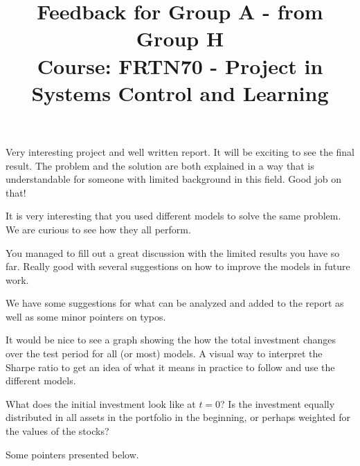 \documentclass[a4paper,11pt]{article}
\title{Feedback for Group A - from Group H \\ Course: FRTN70 - Project in Systems Control and Learning}
\date{}
\begin{document}
\maketitle

Very interesting project and well written report.
It will be exciting to see the final result.
The problem and the solution are both explained in a way that is understandable for someone with limited background in this field.
Good job on that!

It is very interesting that you used different models to solve the same problem.
We are curious to see how they all perform.

You managed to fill out a great discussion with the limited results you have so far.
Really good with several suggestions on how to improve the models in future work.

We have some suggestions for what can be analyzed and added to the report as well as some minor pointers on typos.

It would be nice to see a graph showing the how the total investment changes over the test period for all (or most) models.
A visual way to interpret the Sharpe ratio to get an idea of what it means in practice to follow and use the different models.

What does the initial investment look like at $t = 0$?
Is the investment equally distributed in all assets in the portfolio in the beginning, or perhaps weighted for the values of the stocks?

Some pointers presented below.
\end{document}
